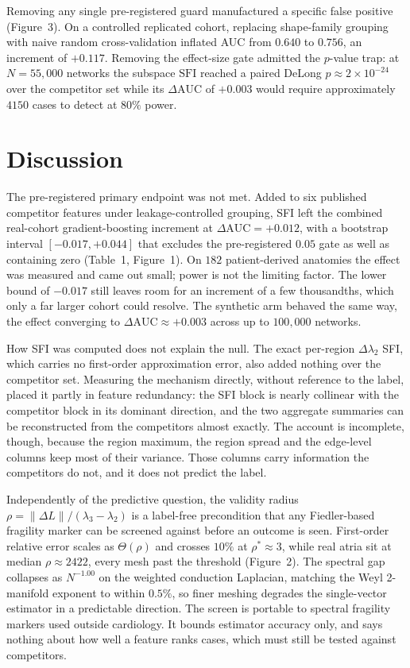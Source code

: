 \documentclass[11pt]{article}
\newcommand{\lam}{\lambda}
\newcommand{\rhoval}{\rho}
\newcommand{\SFI}{\ensuremath{\mathrm{SFI}}}
\newcommand{\dAUC}{\ensuremath{\Delta\mathrm{AUC}}}
\begin{document}
Removing any single pre-registered guard manufactured a specific false positive
(Figure~3). On a controlled replicated cohort, replacing shape-family grouping
with naive random cross-validation inflated AUC from $0.640$ to $0.756$, an
increment of $+0.117$. Removing the effect-size gate admitted the $p$-value trap: at
$N=55{,}000$ networks the subspace \SFI{} reached a paired DeLong
$p\approx2\times10^{-24}$ over the competitor set while its $\dAUC$ of $+0.003$
would require approximately $4150$ cases to detect at $80\%$ power.

\section{Discussion}

The pre-registered primary endpoint was not met. Added to six published
competitor features under leakage-controlled grouping, SFI left the combined
real-cohort gradient-boosting increment at $\dAUC=+0.012$, with a bootstrap
interval $[-0.017,+0.044]$ that excludes the pre-registered $0.05$ gate as well
as containing zero (Table~1, Figure~1). On $182$ patient-derived anatomies the
effect was measured and came out small; power is not the limiting factor. The
lower bound of $-0.017$ still leaves room for an increment of a few thousandths,
which only a far larger cohort could resolve. The synthetic arm behaved the same way, the effect converging
to $\dAUC\approx+0.003$ across up to $100{,}000$ networks.

How SFI was computed does not explain the null. The exact per-region $\Delta\lam_2$
SFI, which carries no first-order approximation error, also added nothing over
the competitor set. Measuring the mechanism directly, without reference to the
label, placed it partly in feature redundancy: the SFI block is nearly collinear
with the competitor block in its dominant direction, and the two aggregate
summaries can be reconstructed from the competitors almost exactly. The account
is incomplete, though, because the region maximum, the region spread and the
edge-level columns keep most of their variance. Those columns carry information
the competitors do not, and it does not predict the label.

Independently of the predictive question, the validity radius
$\rhoval=\lVert\Delta L\rVert/(\lam_3-\lam_2)$ is a label-free precondition that
any Fiedler-based fragility marker can be screened against before an outcome is
seen. First-order relative error scales as $\Theta(\rhoval)$ and crosses $10\%$
at $\rhoval^\ast\approx3$, while real atria sit at median $\rhoval\approx2422$,
every mesh past the threshold (Figure~2). The spectral gap collapses as
$N^{-1.00}$ on the weighted conduction Laplacian, matching the Weyl 2-manifold
exponent to within $0.5\%$, so finer meshing degrades the single-vector
estimator in a predictable direction. The screen is portable to spectral
fragility markers used outside cardiology. It bounds estimator accuracy only,
and says nothing about how well a feature ranks cases, which must still be
tested against competitors.
\end{document}
